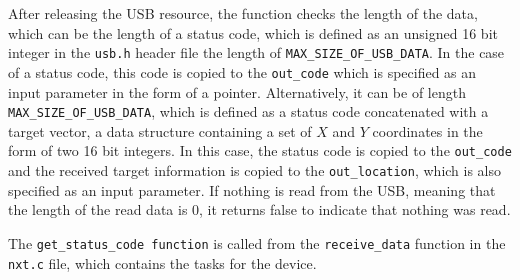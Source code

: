 After releasing the USB resource, the function checks the length of the data, which can be the length of a status code, which is defined as an unsigned 16 bit integer in the \texttt{usb.h} header file the length of \texttt{MAX\_SIZE\_OF\_USB\_DATA}.
In the case of a status code, this code is copied to the \texttt{out\_code} which is specified as an input parameter in the form of a pointer.
Alternatively, it can be of length \texttt{MAX\_SIZE\_OF\_USB\_DATA}, which is defined as a status code concatenated with a target vector, a data structure containing a set of $X$ and $Y$ coordinates in the form of two 16 bit integers.
In this case, the status code is copied to the \texttt{out\_code} and the received target information is copied to the \texttt{out\_location}, which is also specified as an input parameter.
If nothing is read from the USB, meaning that the length of the read data is $0$, it returns false to indicate that nothing was read.

The \texttt{get\_status\_code function} is called from the \texttt{receive\_data} function in the \texttt{nxt.c} file, which contains the tasks for the device.

